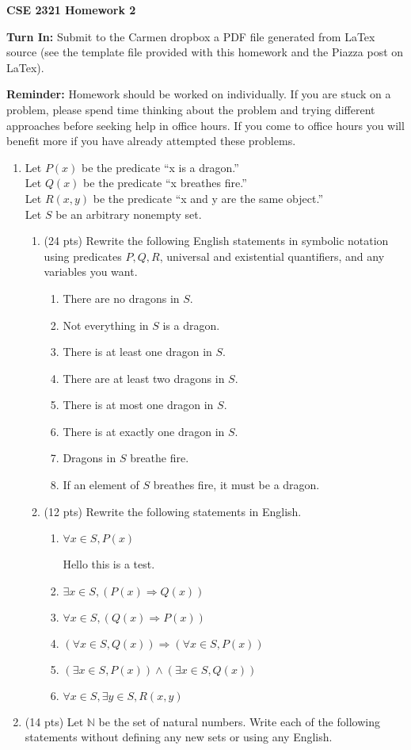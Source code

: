\documentclass[14pt]{extarticle}
\begin{document}
\textbf{CSE 2321 Homework 2}

\textbf{Turn In:} Submit to the Carmen dropbox a PDF file generated from LaTex source (see the template file provided with this homework and the Piazza post on LaTex).

\textbf{Reminder:} Homework should be worked on individually. If you are stuck on a problem, please spend time thinking about the problem and trying different approaches before seeking help in office hours. If you come to office hours you will benefit more if you have already attempted these problems. 

\begin{enumerate}
\item Let $P(x)$ be the predicate ``x is a dragon.''\\Let $Q(x)$ be the predicate ``x breathes fire.''\\Let $R(x, y)$ be the predicate ``x and y are the same object.''\\Let $S$ be an arbitrary nonempty set.
\begin{enumerate}
\item (24 pts) Rewrite the following English statements in symbolic notation using predicates $P, Q, R$, universal and existential quantifiers, and any variables you want.
\begin{enumerate}
\item There are no dragons in $S$.
\item Not everything in $S$ is a dragon.
\item There is at least one dragon in $S$.
\item There are at least two dragons in $S$.
\item There is at most one dragon in $S$.
\item There is at exactly one dragon in $S$.
\item Dragons in $S$ breathe fire.
\item If an element of $S$ breathes fire, it must be a dragon.
\end{enumerate}
\item (12 pts) Rewrite the following statements in English.
\begin{enumerate}
\item $\forall x \in S, P(x)$

Hello this is a test.
\item $\exists x \in S, (P(x) \Rightarrow Q(x))$
\item $\forall x \in S, (Q(x) \Rightarrow P(x))$
\item $(\forall x \in S, Q(x)) \Rightarrow (\forall x \in S, P(x))$
\item $(\exists x \in S, P(x)) \land (\exists x \in S, Q(x))$
\item $\forall x \in S, \exists y \in S, R(x, y)$
\end{enumerate}
\end{enumerate}
\pagebreak
\item (14 pts) Let $\mathbb{N}$ be the set of natural numbers.
Write each of the following statements without defining any new sets or using any English. 


\end{enumerate}
\end{document}
